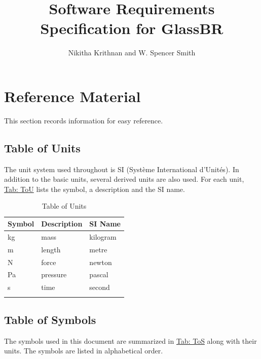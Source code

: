 \documentclass[12pt]{article}
\title{Software Requirements Specification for GlassBR}
\author{Nikitha Krithnan and W. Spencer Smith}
\begin{document}
\maketitle
\tableofcontents
\newpage
\section{Reference Material}
\label{Sec:RefMat}
This section records information for easy reference.

\subsection{Table of Units}
\label{Sec:ToU}
The unit system used throughout is SI (Système International d'Unités). In addition to the basic units, several derived units are also used. For each unit, \hyperref[Table:ToU]{Tab: ToU} lists the symbol, a description and the SI name.

\begin{longtable}{l l l}
\toprule
\textbf{Symbol} & \textbf{Description} & \textbf{SI Name}
\\
\midrule
\endhead
kg & mass & kilogram
\\
m & length & metre
\\
N & force & newton
\\
Pa & pressure & pascal
\\
s & time & second
\\
\bottomrule
\caption{Table of Units}
\label{Table:ToU}
\end{longtable}
\subsection{Table of Symbols}
\label{Sec:ToS}
The symbols used in this document are summarized in \hyperref[Table:ToS]{Tab: ToS} along with their units. The symbols are listed in alphabetical order.
\end{document}

